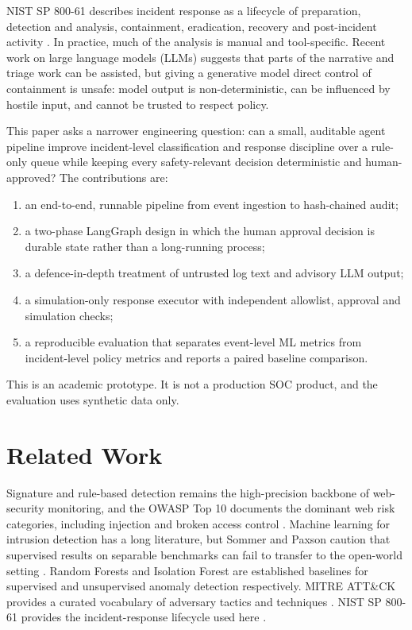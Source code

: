 \documentclass[10pt,twocolumn]{article}
\begin{document}
NIST SP 800-61 describes incident response as a lifecycle of preparation, detection and analysis, containment, eradication, recovery and post-incident activity \cite{nist80061}. In practice, much of the analysis is manual and tool-specific. Recent work on large language models (LLMs) suggests that parts of the narrative and triage work can be assisted, but giving a generative model direct control of containment is unsafe: model output is non-deterministic, can be influenced by hostile input, and cannot be trusted to respect policy.

This paper asks a narrower engineering question: can a small, auditable agent pipeline improve incident-level classification and response discipline over a rule-only queue while keeping every safety-relevant decision deterministic and human-approved? The contributions are:
\begin{enumerate}
  \item an end-to-end, runnable pipeline from event ingestion to hash-chained audit;
  \item a two-phase LangGraph design in which the human approval decision is durable state rather than a long-running process;
  \item a defence-in-depth treatment of untrusted log text and advisory LLM output;
  \item a simulation-only response executor with independent allowlist, approval and simulation checks;
  \item a reproducible evaluation that separates event-level ML metrics from incident-level policy metrics and reports a paired baseline comparison.
\end{enumerate}

This is an academic prototype. It is not a production SOC product, and the evaluation uses synthetic data only.

\section{Related Work}

Signature and rule-based detection remains the high-precision backbone of web-security monitoring, and the OWASP Top 10 documents the dominant web risk categories, including injection and broken access control \cite{owasp}. Machine learning for intrusion detection has a long literature, but Sommer and Paxson caution that supervised results on separable benchmarks can fail to transfer to the open-world setting \cite{sommer}. Random Forests \cite{breiman} and Isolation Forest \cite{liu} are established baselines for supervised and unsupervised anomaly detection respectively. MITRE ATT\&CK provides a curated vocabulary of adversary tactics and techniques \cite{mitre}. NIST SP 800-61 provides the incident-response lifecycle used here \cite{nist80061}.
\end{document}
